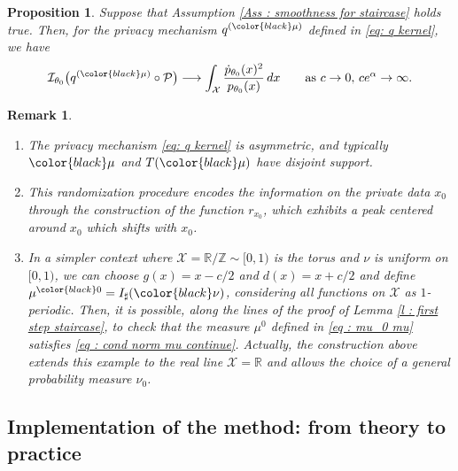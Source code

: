 \documentclass[a4paper, 11pt]{article}
\newtheorem{prop}{Proposition}
\newtheorem{rem}{Remark}
\theoremstyle{definition}
\newcommand{\modar}{\color{black}}
\begin{document}
{{\begin{prop}\label{prop: kernel}
	Suppose that Assumption \ref{Ass : smoothness for staircase} holds true.
	Then, for the privacy mechanism \( q^{({\modar \mu})} \) defined in \eqref{eq: q kernel}, we have
	\[
	\mathcal{I}_{\theta_0}\big(q^{({\modar \mu})} \circ \mathcal{P}\big)
\longrightarrow
	\int_\mathcal{X} \frac{\dot{p}_{\theta_0}(x)^2}{p_{\theta_0}(x)}\, dx
	\qquad \text{as } c \to 0, \, c e^\alpha \to \infty.
	\]
\end{prop}
\begin{rem}
	\begin{enumerate}
		\item The privacy mechanism \eqref{eq: q kernel} is  %
		asymmetric, and typically ${\modar\mu}$ and $T({\modar \mu})$ have disjoint support.
		\item This randomization procedure encodes the information on the 
		private data $x_0$ through the construction of the function $r_{x_0}$,
		 {\modar which exhibits} %
		 a peak centered around \( x_0 \) which shifts with \( x_0 \).
		 \item  In a simpler context where $\mathcal{X}=\mathbb{R}/\mathbb{Z} \sim [0,1)$ is the torus and {\modar $\nu$} is uniform on $[0,1)$, we can choose $g(x)=x-c/2$ and $d(x)=x+c/2$ and define $\mu^{\modar 0}=I_\sharp({\modar \nu})$,  considering all functions on $\mathcal{X}$ as $1$-periodic. 		 
		 Then, it is possible, along the lines of the proof of Lemma \ref{l : first step staircase}, to check that the measure $\mu^0$ defined in \eqref{eq : mu_0 mu} satisfies 
		 \eqref{eq : cond norm mu continue}. Actually, the construction above extends this example to the real line $\mathcal{X}=\mathbb{R}$ and allows the choice of a general probability measure $\nu_0$.
	\end{enumerate}
\end{rem}
}
\subsection{Implementation of the method: from theory to practice}
\label{ss: Implementation}

}
\end{document}
